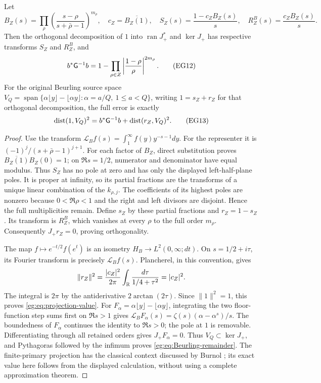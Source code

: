 \documentclass[11pt]{article}
\begin{document}
\begin{egtheorem}\label{eg:thm:projection}
Let
\[
 B_Z(s)=\prod_\rho\left(\frac{s-\rho}{s+\bar\rho-1}\right)^{m_\rho},
 \quad c_Z=\overline{B_Z(1)},\quad
 S_Z(s)=\frac{1-c_ZB_Z(s)}s,\quad R_Z^B(s)=\frac{c_ZB_Z(s)}s.
 \tag{EG11}\label{eg:eq:Blaschke}
\]
Then the orthogonal decomposition of $1$ into $\operatorname{ran}J_+^*$
and $\ker J_+$ has respective transforms $S_Z$ and $R_Z^B$, and
\[
 b^*\mathsf G^{-1}b=1-\prod_{\rho\in Z}
                   \left|\frac{1-\rho}{\rho}\right|^{2m_\rho}.
 \tag{EG12}\label{eg:eq:projection-value}
\]
For the original Beurling source space
$V_Q=\operatorname{span}\{\alpha\lfloor y\rfloor-\lfloor\alpha y\rfloor:
\alpha=a/Q,\ 1\le a<Q\}$, writing $1=s_Z+r_Z$ for that orthogonal
decomposition, the full error is exactly
\[
 \operatorname{dist}(1,V_Q)^2=b^*\mathsf G^{-1}b+
                                      \operatorname{dist}(r_Z,V_Q)^2.
 \tag{EG13}\label{eg:eq:Beurling-remainder}
\]
\end{egtheorem}
\begin{proof}
Use the transform $\mathcal L_Bf(s)=\int_1^\infty f(y)y^{-s-1}dy$.
For the representer it is $(-1)^j/(s+\bar\rho-1)^{j+1}$.
For each factor of $B_Z$, direct substitution proves
$\overline{B_Z(1)}B_Z(0)=1$; on $\Re s=1/2$, numerator and
denominator have equal modulus. Thus $S_Z$ has no pole at zero and
has only the displayed left-half-plane poles. It is proper at
infinity, so its partial fractions are the transforms of a unique
linear combination of the $k_{\rho,j}$. The coefficients of its
highest poles are nonzero because $0<\Re\rho<1$ and the right and
left divisors are disjoint. Hence the full multiplicities remain.
Define $s_Z$ by these partial fractions and $r_Z=1-s_Z$. Its
transform is $R_Z^B$, which vanishes at every $\rho$ to the full
order $m_\rho$. Consequently $J_+r_Z=0$, proving orthogonality.

The map $f\mapsto e^{-t/2}f(e^t)$ is an isometry
$H_B\to L^2(0,\infty;dt)$. On $s=1/2+i\tau$, its Fourier transform
is precisely $\mathcal L_Bf(s)$. Plancherel, in this convention,
gives
\[
 \|r_Z\|^2=\frac{|c_Z|^2}{2\pi}
                  \int_\mathbb R\frac{d\tau}{1/4+\tau^2}=|c_Z|^2.
\]
The integral is $2\pi$ by the antiderivative $2\arctan(2\tau)$.
Since $\|1\|^2=1$, this proves \eqref{eg:eq:projection-value}.
For $F_\alpha=\alpha\lfloor y\rfloor-\lfloor\alpha y\rfloor$,
integrating the two floor-function step sums first on $\Re s>1$
gives $\mathcal L_BF_\alpha(s)=\zeta(s)(\alpha-\alpha^s)/s$.
The boundedness of $F_\alpha$ continues the identity to $\Re s>0$;
the pole at $1$ is removable. Differentiating through all retained
orders gives $J_+F_\alpha=0$. Thus $V_Q\subset\ker J_+$, and
Pythagoras followed by the infimum proves \eqref{eg:eq:Beurling-remainder}.
The finite-primary projection has the classical context discussed
by Burnol \cite{eg:Burnol}; its exact value here follows from the
displayed calculation, without using a complete approximation theorem.
\end{proof}
\end{document}
